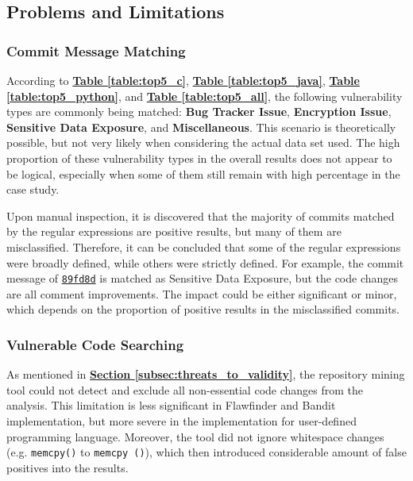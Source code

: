 \documentclass[12pt, a4paper]{report}
\begin{document}
\subsection{Problems and Limitations} \label{subsec:result_prob_and_limit}
\subsubsection*{Commit Message Matching}
According to \hyperref[table:top5_c]{\textbf{Table \ref*{table:top5_c}}},
\hyperref[table:top5_java]{\textbf{Table \ref*{table:top5_java}}},
\hyperref[table:top5_python]{\textbf{Table \ref*{table:top5_python}}}, and
\hyperref[table:top5_all]{\textbf{Table \ref*{table:top5_all}}}, the following vulnerability types
are commonly being matched: \textbf{Bug Tracker Issue}, \textbf{Encryption Issue}, \textbf{Sensitive
Data Exposure}, and \textbf{Miscellaneous}. This scenario is theoretically possible, but not very
likely when considering the actual data set used. The high proportion of these vulnerability types
in the overall results does not appear to be logical, especially when some of them still remain with
high percentage in the case study.

Upon manual inspection, it is discovered that the majority of commits matched by the regular
expressions are positive results, but many of them are misclassified. Therefore, it can be concluded
that some of the regular expressions were broadly defined, while others were strictly defined. For
example, the commit message of
\href{https://github.com/apache/httpd/commit/89fd8d}{\color{blue}\texttt{89fd8d}} is matched as
Sensitive Data Exposure, but the code changes are all comment improvements. The impact could be
either significant or minor, which depends on the proportion of positive results in the
misclassified commits.

\subsubsection*{Vulnerable Code Searching}
As mentioned in \hyperref[subsec:threats_to_validity]{\textbf{Section
\ref*{subsec:threats_to_validity}}}, the repository mining tool could not detect and exclude all
non-essential code changes from the analysis. This limitation is less significant in Flawfinder and
Bandit implementation, but more severe in the implementation for user-defined programming language.
Moreover, the tool did not ignore whitespace changes (e.g. \texttt{memcpy()} to \texttt{memcpy ()}),
which then introduced considerable amount of false positives into the results.
\end{document}
